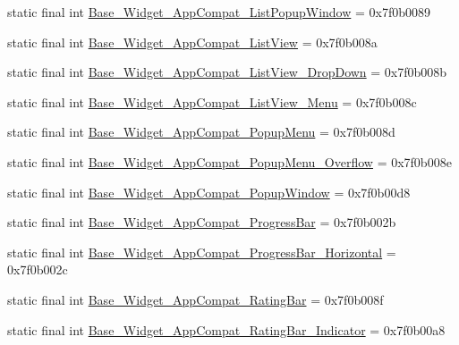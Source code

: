 \begin{CompactItemize}
\item 
static final int \hyperlink{classandroid_1_1support_1_1graphics_1_1drawable_1_1animated_1_1_r_1_1style_69d8f0f4188303df4494b70c84851d85}{Base\_\-Widget\_\-AppCompat\_\-ListPopupWindow} = 0x7f0b0089
\item 
static final int \hyperlink{classandroid_1_1support_1_1graphics_1_1drawable_1_1animated_1_1_r_1_1style_91104ef5465d049dfb80f3de125a0da6}{Base\_\-Widget\_\-AppCompat\_\-ListView} = 0x7f0b008a
\item 
static final int \hyperlink{classandroid_1_1support_1_1graphics_1_1drawable_1_1animated_1_1_r_1_1style_70d21acfec2bf0989caa13476d43291f}{Base\_\-Widget\_\-AppCompat\_\-ListView\_\-DropDown} = 0x7f0b008b
\item 
static final int \hyperlink{classandroid_1_1support_1_1graphics_1_1drawable_1_1animated_1_1_r_1_1style_f1214a24b04e9d9540452adcbdce1dfb}{Base\_\-Widget\_\-AppCompat\_\-ListView\_\-Menu} = 0x7f0b008c
\item 
static final int \hyperlink{classandroid_1_1support_1_1graphics_1_1drawable_1_1animated_1_1_r_1_1style_ad5c9d4a53606ac75e3dd4094ee6eddb}{Base\_\-Widget\_\-AppCompat\_\-PopupMenu} = 0x7f0b008d
\item 
static final int \hyperlink{classandroid_1_1support_1_1graphics_1_1drawable_1_1animated_1_1_r_1_1style_3885b9c5624591a2e9f6401b2dc81852}{Base\_\-Widget\_\-AppCompat\_\-PopupMenu\_\-Overflow} = 0x7f0b008e
\item 
static final int \hyperlink{classandroid_1_1support_1_1graphics_1_1drawable_1_1animated_1_1_r_1_1style_5bf4b5baf2f5a3b34e025e8cfb23ae05}{Base\_\-Widget\_\-AppCompat\_\-PopupWindow} = 0x7f0b00d8
\item 
static final int \hyperlink{classandroid_1_1support_1_1graphics_1_1drawable_1_1animated_1_1_r_1_1style_4c9a8f4e424ac9526d882c666bf7a860}{Base\_\-Widget\_\-AppCompat\_\-ProgressBar} = 0x7f0b002b
\item 
static final int \hyperlink{classandroid_1_1support_1_1graphics_1_1drawable_1_1animated_1_1_r_1_1style_44e8cf7bc4ebae780f4aac5022afe3a5}{Base\_\-Widget\_\-AppCompat\_\-ProgressBar\_\-Horizontal} = 0x7f0b002c
\item 
static final int \hyperlink{classandroid_1_1support_1_1graphics_1_1drawable_1_1animated_1_1_r_1_1style_4fcdacfad06ca883a59d5ce9a6448479}{Base\_\-Widget\_\-AppCompat\_\-RatingBar} = 0x7f0b008f
\item 
static final int \hyperlink{classandroid_1_1support_1_1graphics_1_1drawable_1_1animated_1_1_r_1_1style_634fe8949a48661ff29644bd73d8628f}{Base\_\-Widget\_\-AppCompat\_\-RatingBar\_\-Indicator} = 0x7f0b00a8

\end{CompactItemize}
